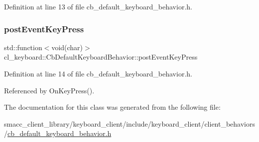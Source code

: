 Definition at line 13 of file cb\+\_\+default\+\_\+keyboard\+\_\+behavior.\+h.

\mbox{\label{classcl__keyboard_1_1CbDefaultKeyboardBehavior_abd29833a0f94aa1d5aa1834d15ab1281}} 
\subsubsection{\texorpdfstring{post\+Event\+Key\+Press}{postEventKeyPress}}
{\footnotesize\ttfamily std\+::function$<$void(char)$>$ cl\+\_\+keyboard\+::\+Cb\+Default\+Keyboard\+Behavior\+::post\+Event\+Key\+Press}



Definition at line 14 of file cb\+\_\+default\+\_\+keyboard\+\_\+behavior.\+h.



Referenced by On\+Key\+Press().



The documentation for this class was generated from the following file\+:\begin{DoxyCompactItemize}
\item 
smacc\+\_\+client\+\_\+library/keyboard\+\_\+client/include/keyboard\+\_\+client/client\+\_\+behaviors/\hyperlink{cb__default__keyboard__behavior_8h}{cb\+\_\+default\+\_\+keyboard\+\_\+behavior.\+h}\end{DoxyCompactItemize}
